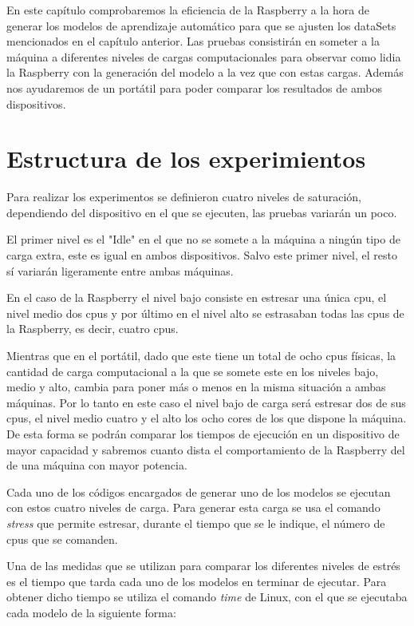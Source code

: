 \documentclass[a4paper, 12pt]{book}
\begin{document}
En este capítulo comprobaremos la eficiencia de la Raspberry a la hora de generar los modelos de aprendizaje automático para que se ajusten los dataSets mencionados en el capítulo anterior. Las pruebas consistirán en someter a la máquina a diferentes niveles de cargas computacionales para observar como lidia la Raspberry con la generación del modelo a la vez que con estas cargas.
Además nos ayudaremos de un portátil para poder comparar los resultados de ambos dispositivos.

\section{Estructura de los experimientos}
\label{sec:estructura_experimentos}

Para realizar los experimentos se definieron cuatro niveles de saturación, dependiendo del dispositivo en el que se ejecuten, las pruebas variarán un poco. 

El primer nivel es el "Idle" en el que no se somete a la máquina a ningún tipo de carga extra, este es igual en ambos dispositivos. Salvo este primer nivel, el resto sí variarán ligeramente entre ambas máquinas.

En el caso de la Raspberry el nivel bajo consiste en estresar una única cpu, el nivel medio dos cpus y por último en el nivel alto se estrasaban todas las cpus de la Raspberry, es decir, cuatro cpus. 

Mientras que en el portátil, dado que este tiene un total de ocho cpus físicas, la cantidad de carga computacional a la que se somete este en los niveles bajo, medio y alto, cambia para poner más o menos en la misma situación a ambas máquinas. Por lo tanto en este caso el nivel bajo de carga será estresar dos de sus cpus, el nivel medio cuatro y el alto los ocho cores de los que dispone la máquina. De esta forma se podrán comparar los tiempos de ejecución en un dispositivo de mayor capacidad y sabremos cuanto dista el comportamiento de la Raspberry del de una máquina con mayor potencia.

Cada uno de los códigos encargados de generar uno de los modelos se ejecutan con estos cuatro niveles de carga. Para generar esta carga se usa el comando \textit{stress} que permite estresar, durante el tiempo que se le indique, el número de cpus que se comanden. 

Una de las medidas que se utilizan para comparar los diferentes niveles de estrés es el tiempo que tarda cada uno de los modelos en terminar de ejecutar. Para obtener dicho tiempo se utiliza el comando \textit{time} de Linux, con el que se ejecutaba cada modelo de la siguiente forma:\\
\end{document}
